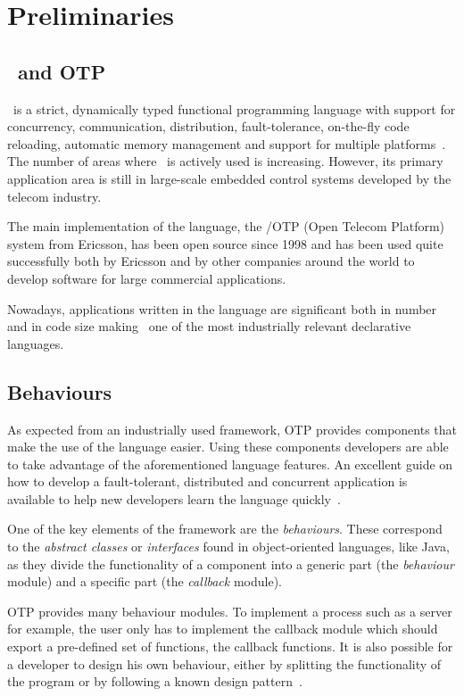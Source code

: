 \chapter{Preliminaries}

\section{\er\ and OTP}
\label{sct:erlang_preliminaries}

\er\ is a strict, dynamically typed functional programming language
with support for concurrency, communication, distribution,
fault-tolerance, on-the-fly code reloading, automatic memory
management and support for multiple platforms~\cite{joe_book1}. The
number of areas where \er\ is actively used is increasing. However,
its primary application area is still in large-scale embedded control
systems developed by the telecom industry.

The main implementation of the language, the \er/OTP (Open Telecom
Platform) system from Ericsson, has been open source since 1998 and
has been used quite successfully both by Ericsson and by other
companies around the world to develop software for large commercial
applications.

Nowadays, applications written in the language are significant both in
number and in code size making \er\ one of the most industrially
relevant declarative languages.

\section{Behaviours}
\label{sct:behaviour_preliminaries}

As expected from an industrially used framework, OTP provides
components that make the use of the language easier. Using these
components developers are able to take advantage of the aforementioned
language features. An excellent guide on how to develop a
fault-tolerant, distributed and concurrent application is available to
help new developers learn the language quickly~\cite{des_princ}.

One of the key elements of the framework are the
\emph{behaviours}. These correspond to the \emph{abstract classes} or
\emph{interfaces} found in object-oriented languages, like Java, as
they divide the functionality of a component into a generic part (the
\emph{behaviour} module) and a specific part (the \emph{callback}
module).

OTP provides many behaviour modules. To implement a process such as a
server for example, the user only has to implement the callback module
which should export a pre-defined set of functions, the callback
functions. It is also possible for a developer to design his own
behaviour, either by splitting the functionality of the program or by
following a known design pattern~\cite{behaviours}.

